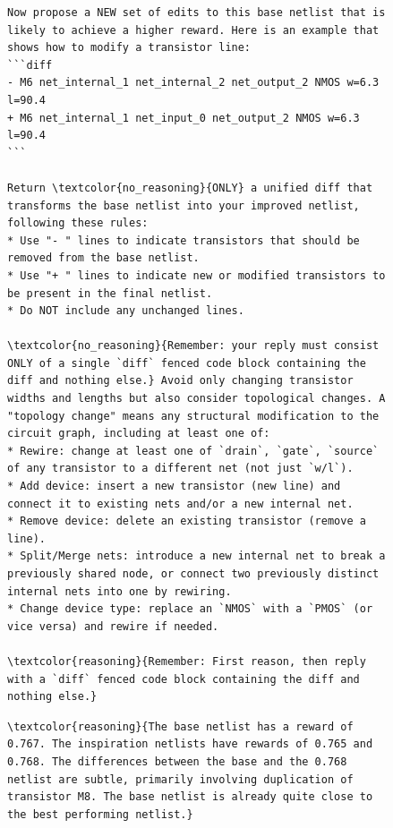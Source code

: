 \documentclass[sigconf,pbalance]{acmart_modified}
\begin{document}
\begin{figure}
\begin{minipage}[t]{0.54\textwidth}
\begin{prompt}
\begin{Verbatim}[breaklines=true,breaksymbolleft={},commandchars=\\\{\}]
Now propose a NEW set of edits to this base netlist that is likely to achieve a higher reward. Here is an example that shows how to modify a transistor line:
```diff
- M6 net_internal_1 net_internal_2 net_output_2 NMOS w=6.3 l=90.4
+ M6 net_internal_1 net_input_0 net_output_2 NMOS w=6.3 l=90.4
```

Return \textcolor{no_reasoning}{ONLY} a unified diff that transforms the base netlist into your improved netlist, following these rules:
* Use "- " lines to indicate transistors that should be removed from the base netlist.
* Use "+ " lines to indicate new or modified transistors to be present in the final netlist.
* Do NOT include any unchanged lines.

\textcolor{no_reasoning}{Remember: your reply must consist ONLY of a single `diff` fenced code block containing the diff and nothing else.} Avoid only changing transistor widths and lengths but also consider topological changes. A "topology change" means any structural modification to the circuit graph, including at least one of:
* Rewire: change at least one of `drain`, `gate`, `source` of any transistor to a different net (not just `w/l`).
* Add device: insert a new transistor (new line) and connect it to existing nets and/or a new internal net.
* Remove device: delete an existing transistor (remove a line).
* Split/Merge nets: introduce a new internal net to break a previously shared node, or connect two previously distinct internal nets into one by rewiring.
* Change device type: replace an `NMOS` with a `PMOS` (or vice versa) and rewire if needed.

\textcolor{reasoning}{Remember: First reason, then reply with a `diff` fenced code block containing the diff and nothing else.}
\end{Verbatim}
\end{prompt}
\end{minipage}\hfill
\begin{minipage}[t]{0.44\textwidth}
\vspace{0pt}
\begin{prompt}
    \fontsize{6pt}{6pt}\selectfont
    \ttfamily\hspace*{1cm}
    \begin{Verbatim}[breaklines=true,breaksymbolleft={},commandchars=\\\{\}]
\textcolor{reasoning}{The base netlist has a reward of 0.767. The inspiration netlists have rewards of 0.765 and 0.768. The differences between the base and the 0.768 netlist are subtle, primarily involving duplication of transistor M8. The base netlist is already quite close to the best performing netlist.}


\end{Verbatim}
\end{prompt}
\end{minipage}
\end{figure}
\end{document}
